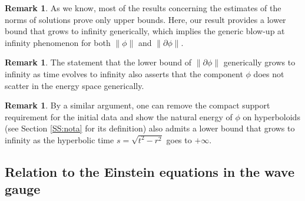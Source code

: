 \documentclass[a4paper,reqno]{amsart}
\theoremstyle{definition}
\newtheorem{remark}[theorem]{Remark}
\numberwithin{equation}{section}
\begin{document}
\begin{remark}
As we know, most of the results concerning the estimates of the norms of solutions prove only upper bounds. Here, our result provides a lower bound that grows to infinity generically, which implies the generic blow-up at infinity phenomenon for both $\|\phi\|$ and $\|\partial\phi\|$.
\end{remark}

\begin{remark}
   The statement that the lower bound of $\|\partial \phi\|$ generically grows to infinity as time evolves to infinity also asserts that the component $\phi$ does not scatter in the energy space generically.
\end{remark}


\begin{remark}
By a similar argument, one can remove the compact support requirement for the initial data and show the natural energy of $\phi$ on hyperboloids (see Section \ref{SS:nota} for its definition) also admits a lower bound that grows to infinity as the hyperbolic time $s=\sqrt{t^2-r^2}$ goes to $+\infty$.
\end{remark}

\subsection{Relation to the Einstein equations in the wave gauge}
\label{subsect:VEEinwavegauge}
\end{document}
